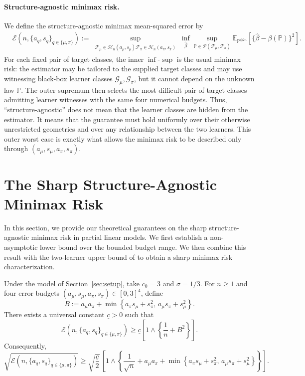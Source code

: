 \documentclass[11pt]{article}
\begin{document}
\paragraph{Structure-agnostic minimax risk.}
We define the structure-agnostic minimax mean-squared error by
\begin{align}
&\mathcal E\!\left(
n,\{a_q,s_q\}_{q\in\{\mu,\pi\}}
\right):=
\sup_{\substack{
\mathcal F_\mu\in
\mathcal H_n(a_\mu,s_\mu)
\mathcal F_\pi\in
\mathcal H_n(a_\pi,s_\pi)
}}
\inf_{\widehat\beta}
\sup_{\mathbb P\in
\mathcal P(\mathcal F_\mu,\mathcal F_\pi)}
\mathbb E_{\mathbb P^{\otimes 2n}}
\left[
\{\widehat\beta-\beta(\mathbb P)\}^2
\right].
\label{eq:structure-agnostic-risk}
\end{align}
For each fixed pair of target classes, the inner \(\inf\)-\(\sup\) is the
usual minimax risk: the estimator may be tailored to the supplied target
classes and may use witnessing black-box learner classes
\(\mathcal G_\mu,\mathcal G_\pi\), but it cannot depend on the unknown law
\(\mathbb P\).  The outer supremum then selects the most difficult pair of
target classes admitting learner witnesses with the same four numerical
budgets.  Thus,
``structure-agnostic'' does not mean that the learner classes are hidden from
the estimator.  It means that the guarantee must hold uniformly over their
otherwise unrestricted geometries and over any relationship between the two
learners.  This outer worst case is exactly what allows the minimax risk to be
described only through \((a_\mu,s_\mu,a_\pi,s_\pi)\).




\section{The Sharp Structure-Agnostic Minimax Risk}
\label{sec:thms}

In this section, we provide our theoretical guarantees on the sharp structure-agnostic minimax risk in partial linear models. We first establish a non-asymptotic lower bound over the bounded budget
range.  We then combine this result with the two-learner upper bound of
\citet{gu2026optimal} to obtain a sharp minimax risk characterization.

\begin{theorem}
\label{thm:lower_bound}
Under the model of Section~\ref{sec:setup}, take \(c_0=3\) and
\(\sigma=1/3\).  For \(n\geq1\) and four error budgets $(a_\mu,s_\mu,a_\pi,s_\pi)\in[0,3]^4$, define
\[
B
:=
a_\mu a_\pi
+
\min\left\{
a_\pi s_\mu+s_\pi^2,\,
a_\mu s_\pi+s_\mu^2
\right\}.
\]
There exists a universal constant \(\underline c>0\) such that
\[
\mathcal E\!\left(
n,\{a_q,s_q\}_{q\in\{\mu,\pi\}}
\right)
\geq
\underline c
\left[
1\wedge
\left\{
\frac1n+B^2
\right\}
\right].
\]
Consequently,
\[
\sqrt{
\mathcal E\!\left(
n,\{a_q,s_q\}_{q\in\{\mu,\pi\}}
\right)
}
\geq
\sqrt{\frac{\underline c}{2}}\,
\left[
1\wedge
\left\{
\frac1{\sqrt n}
+a_\mu a_\pi
+\min\left\{
a_\pi s_\mu+s_\pi^2,\,
a_\mu s_\pi+s_\mu^2
\right\}
\right\}
\right].
\]
\end{theorem}
\end{document}
